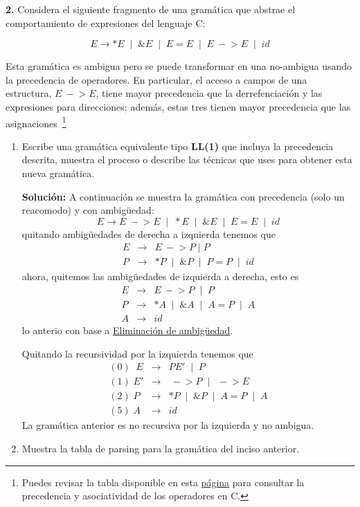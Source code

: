 \textbf{2.} Considera el siguiente fragmento de una gram\'atica que abstrae el 
comportamiento de expresiones del lenguaje \textsf{C}:

\[
E \to *E \;\mid\; \&E \;\mid\; E = E \;\mid\; E\ -\!> E \;\mid\; id
\]

Esta gram\'atica es ambigua pero se puede transformar en una no-ambigua usando
la precedencia de operadores.
En particular, el acceso a campos de una estructura, $E\ -\!> E$, tiene mayor 
precedencia que la derrefenciaci\'on y las expresiones para direcciones; 
adem\'as, estas tres tienen mayor precedencia que las 
asignaciones~\footnote{Puedes revisar la tabla disponible en esta 
\href{https://justdocodings.blogspot.com/2018/06/operator-precedence-and-associativity.html}{p\'agina} 
para consultar la precedencia y asociatividad de los operadores en \textsc{C}.}
\begin{enumerate}
\item Escribe una gram\'atica equivalente tipo \textbf{LL(1)} que incluya la
precedencia descrita, muestra el proceso o describe las técnicas que uses para 
obtener esta nueva gramática.

\textbf{Solución:} A continuación se muestra la gramática con precedencia (solo un reacomodo)
y con ambig\"uedad:
\[ E \to E\ -\!> E \;\mid\; *E \;\mid\; \&E \;\mid\; E = E \;\mid\; id\]
quitando ambig\"uedades de derecha a izquierda tenemos que
\begin{eqnarray*}
         E &\to& E\ -\!> P\; |\; P\\
         P &\to& *P \;\mid\; \&P \;\mid\; P = P \;\mid\; id
\end{eqnarray*}
ahora, quitemos las ambig\"uedades de izquierda a derecha, esto es
\begin{eqnarray*}
         E &\to& E\ -\!> P\;\mid\; P\\
         P &\to& *A \;\mid\; \&A \;\mid\; A = P \;\mid\; A \\
         A &\to& id
\end{eqnarray*}
lo anterio con base a \href{https://barcelonageeks.com/eliminacion-de-ambiguedad-conversion-de-una-gramatica-ambigua-en-gramatica-inequivoca/}{Eliminaci\'on de ambig\"uedad}.

Quitando la recursividad por la izquierda tenemos que
\begin{eqnarray*}
         (0)\;\; E &\to& PE' \;\mid\; P\\
         (1)\; E' &\to& \ -\!> P \;\mid\; \ -\!> E\\
         (2)\; P &\to& *P \;\mid\; \&P \;\mid\; A = P \;\mid\; A \\
         (5)\; A &\to& id
\end{eqnarray*}
La gramática anterior es no recursiva por la izquierda y no ambigua.
\item Muestra la tabla de parsing para la gram\'atica del inciso anterior.


\end{enumerate}
